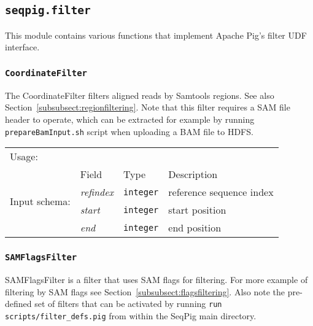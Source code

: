 \subsection{\texttt{seqpig.filter}}

This module contains various functions that implement Apache Pig's
filter UDF interface.

\subsubsection{\texttt{CoordinateFilter}}

The CoordinateFilter filters aligned reads by Samtools regions. See
also Section~\ref{subsubsect:regionfiltering}. Note that this filter
requires a SAM file header to operate, which can be extracted for
example by running {\tt prepareBamInput.sh} script when uploading a
BAM file to HDFS.

\begin{tabular}{lp{}p{}p{}}
Usage: & \multicolumn{3}{l}{}
\hspace*{-0.55cm}\begin{minipage}{0.85\textwidth}
  \begin{lstlisting}
  DEFINE myFilter CoordinateFilter('input.bam.asciiheader','20:1-44350673');
  reads = load 'input.bam' using BamLoader('yes');
  reads = FILTER reads BY myFilter(refindex,start,end);
  \end{lstlisting}
  \end{minipage}\hfill\kern-\arrayrulewidth
 \\[0.25cm]
\multirow{4}{*}{Input schema:} & Field & Type & Description\\[0.1cm]
& \emph{refindex} & \texttt{integer} & reference sequence index\\
& \emph{start} & \texttt{integer} & start position\\
& \emph{end} & \texttt{integer} & end position
\end{tabular}

\subsubsection{\texttt{SAMFlagsFilter}}

SAMFlagsFilter is a filter that uses SAM flags for filtering. For more
example of filtering by SAM flags see
Section~\ref{subsubsect:flagsfiltering}. Also note the pre-defined set
of filters that can be activated by running \texttt{run
  scripts/filter\_defs.pig} from within the SeqPig main directory.

